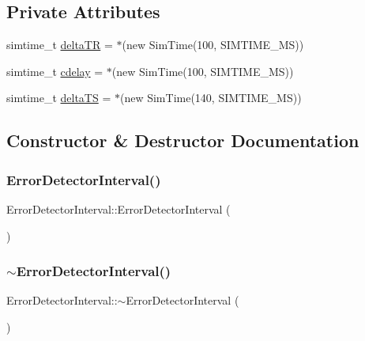 \subsection*{Private Attributes}
\begin{DoxyCompactItemize}
\item 
simtime\+\_\+t \hyperlink{classErrorDetectorInterval_a24f229a469ae7c4314a948015cddb277}{delta\+TR} = $\ast$(new Sim\+Time(100, S\+I\+M\+T\+I\+M\+E\+\_\+\+MS))
\item 
simtime\+\_\+t \hyperlink{classErrorDetectorInterval_adb614477095a1b9753f088f28776c677}{cdelay} = $\ast$(new Sim\+Time(100, S\+I\+M\+T\+I\+M\+E\+\_\+\+MS))
\item 
simtime\+\_\+t \hyperlink{classErrorDetectorInterval_a2368ba76496cfd25487e150a961bb08b}{delta\+TS} = $\ast$(new Sim\+Time(140, S\+I\+M\+T\+I\+M\+E\+\_\+\+MS))
\end{DoxyCompactItemize}


\subsection{Constructor \& Destructor Documentation}
\mbox{\label{classErrorDetectorInterval_a31b5edf31d0bfa45dfe4d0e4733d59b2}} 
\subsubsection{\texorpdfstring{Error\+Detector\+Interval()}{ErrorDetectorInterval()}}
{\footnotesize\ttfamily Error\+Detector\+Interval\+::\+Error\+Detector\+Interval (\begin{DoxyParamCaption}{ }\end{DoxyParamCaption})}

\mbox{\label{classErrorDetectorInterval_a13501d384b2f53dd19dfa1dd9ee0f8fe}} 
\subsubsection{\texorpdfstring{$\sim$\+Error\+Detector\+Interval()}{~ErrorDetectorInterval()}}
{\footnotesize\ttfamily Error\+Detector\+Interval\+::$\sim$\+Error\+Detector\+Interval (\begin{DoxyParamCaption}{ }\end{DoxyParamCaption})\hspace{0.3cm}{\ttfamily [virtual]}}



